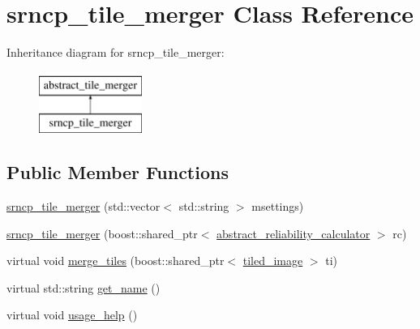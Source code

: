 \hypertarget{classsrncp__tile__merger}{\section{srncp\-\_\-tile\-\_\-merger Class Reference}
\label{classsrncp__tile__merger}
}
Inheritance diagram for srncp\-\_\-tile\-\_\-merger\-:\begin{figure}[H]
\begin{center}
\leavevmode
\includegraphics[height=2.000000cm]{classsrncp__tile__merger}
\end{center}
\end{figure}
\subsection*{Public Member Functions}
\begin{DoxyCompactItemize}
\item 
\hyperlink{classsrncp__tile__merger_aad58c1e54debf4ea2822cf07f6aa98c7}{srncp\-\_\-tile\-\_\-merger} (std\-::vector$<$ std\-::string $>$ msettings)
\item 
\hyperlink{classsrncp__tile__merger_a5b7ffbc05d851f3862a477cf17b31c53}{srncp\-\_\-tile\-\_\-merger} (boost\-::shared\-\_\-ptr$<$ \hyperlink{classabstract__reliability__calculator}{abstract\-\_\-reliability\-\_\-calculator} $>$ rc)
\item 
virtual void \hyperlink{classsrncp__tile__merger_ad8330c73633437c5f4860d837bf63345}{merge\-\_\-tiles} (boost\-::shared\-\_\-ptr$<$ \hyperlink{classtiled__image}{tiled\-\_\-image} $>$ ti)
\item 
virtual std\-::string \hyperlink{classsrncp__tile__merger_a7e6fb5b07129a1354a8d997161b210c4}{get\-\_\-name} ()
\item 
virtual void \hyperlink{classsrncp__tile__merger_ae57137ab8a1df19b86c28d3ff4aa1d9e}{usage\-\_\-help} ()
\end{DoxyCompactItemize}


